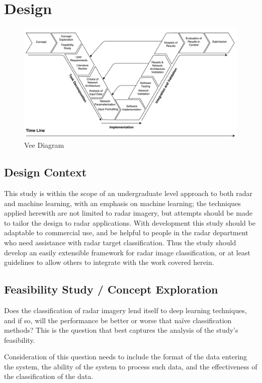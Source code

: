 \chapter{Design}


\begin{figure}[]
\centering
\includegraphics[width=\textwidth]{figures/vee_diagram} %
\caption{Vee Diagram}
\label{fig:vee_diagram}
\centering
\end{figure}



\section{Design Context}
This study is within the scope of an undergraduate level approach to both radar and machine learning, with an emphasis on machine learning; the techniques applied herewith are not limited to radar imagery, but attempts should be made to tailor the design to radar applications. With development this study should be adaptable to commercial use, and be helpful to people in the radar department who need assistance with radar target classification. Thus the study should develop an easily extensible framework for radar image classification, or at least guidelines to allow others to integrate with the work covered herein.


\section{Feasibility Study / Concept Exploration}
Does the classification of radar imagery lend itself to deep learning techniques, and if so, will the performance be better or worse that na{\"i}ve classification methods? This is the question that best captures the analysis of the study's feasibility.

Consideration of this question needs to include the format of the data entering the system, the ability of the system to process such data, and the effectiveness of the classification of the data.

